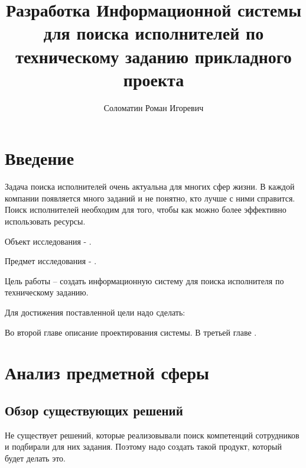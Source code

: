\documentclass[PI,KR]{HSEUniversity}
\title{Разработка Информационной системы для поиска исполнителей по техническому заданию прикладного проекта}
\author{Соломатин Роман Игоревич}
\begin{document}
\maketitle

\chapter*{Введение}

Задача поиска исполнителей очень актуальна для многих сфер жизни. В каждой компании появляется много заданий и не понятно, кто лучше с ними справится. Поиск исполнителей необходим для того, чтобы как можно более эффективно использовать ресурсы. 

Объект исследования - .

Предмет исследования - .

Цель работы – создать информационную систему для поиска исполнителя по техническому заданию.

Для достижения поставленной цели надо сделать:

Во второй главе описание проектирования системы.
В третьей главе .

\chapter{Анализ предметной сферы}
\section{Обзор существующих решений}
Не существует решений, которые реализовывали поиск компетенций сотрудников и подбирали для них задания. Поэтому надо создать такой продукт, который будет делать это.
\end{document}
